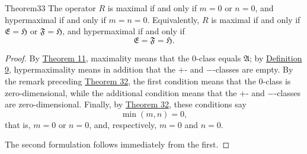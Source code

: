 ﻿\documentclass[paper=b5,fontsize=13pt,bookmarkpackage=false,twoside]{scrartcl}
\begin{document}
\begin{namedstatement}{Theorem}{33}\label{thm:33}
The operator $R$ is maximal if and only if $m=0$ or $n=0$, and hypermaximal if and only if $m=n=0$. Equivalently, $R$ is maximal if and only if $\mathfrak E=\mathfrak H$ or $\mathfrak F=\mathfrak H$, and hypermaximal if and only if
\[
\mathfrak E=\mathfrak F=\mathfrak H.
\]
\end{namedstatement}

\begin{proof}
By \hyperref[thm:11]{Theorem 11}, maximality means that the $0$-class equals $\mathfrak A$; by \hyperref[def:9]{Definition 9}, hypermaximality means in addition that the $+$- and $-$-classes are empty. By the remark preceding \hyperref[thm:32]{Theorem 32}, the first condition means that the $0$-class is zero-dimensional, while the additional condition means that the $+$- and $-$-classes are zero-dimensional. Finally, by \hyperref[thm:32]{Theorem 32}, these conditions say
\[
\min(m,n)=0,
\]
that is, $m=0$ or $n=0$, and, respectively, $m=0$ and $n=0$.

The second formulation follows immediately from the first.
\end{proof}
\end{document}
